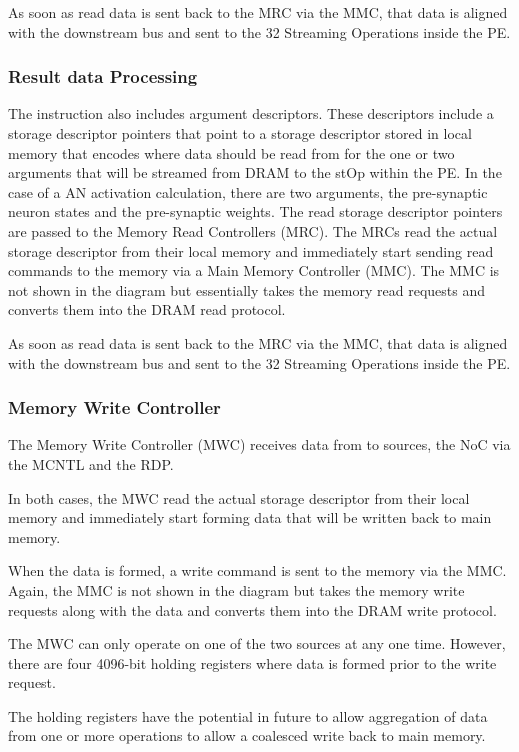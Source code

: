 \documentclass[journal]{IEEEtran}
\begin{document}
As soon as read data is sent back to the MRC via the MMC, that data is aligned with the downstream bus and sent to the 32 Streaming Operations inside the PE.


\subsubsection{Result data Processing}
\label{ssec:resultDataprocessing}
The instruction also includes argument descriptors. These descriptors include a storage descriptor pointers that point to a storage descriptor stored in local memory that encodes where data should be read from for the one or two arguments that will be streamed from DRAM to the stOp within the PE. In the case of a AN activation calculation, there are two arguments, the pre-synaptic neuron states and the pre-synaptic weights. The read storage descriptor pointers are passed to the Memory Read Controllers (MRC). The MRCs read the actual storage descriptor from their local memory and immediately start sending read commands to the memory via a Main Memory Controller (MMC). The MMC is not shown in the diagram but essentially takes the memory read requests and converts them into the DRAM read protocol.

As soon as read data is sent back to the MRC via the MMC, that data is aligned with the downstream bus and sent to the 32 Streaming Operations inside the PE.


\subsubsection{Memory Write Controller}
\label{ssec:memoryWriteController}

The Memory Write Controller (MWC) receives data from to sources, the NoC via the MCNTL and the RDP.

In both cases, the MWC read the actual storage descriptor from their local memory and immediately start forming data that will be written back to main memory.

When the data is formed, a write command is sent to the memory via the MMC. Again, the MMC is not shown in the diagram but takes the memory write requests along with the data and converts them into the DRAM write protocol.

The MWC can only operate on one of the two sources at any one time. However, there are four 4096-bit holding registers where data is formed prior to the write request.

The holding registers have the potential in future to allow aggregation of data from one or more operations to allow a coalesced write back to main memory.
\end{document}
